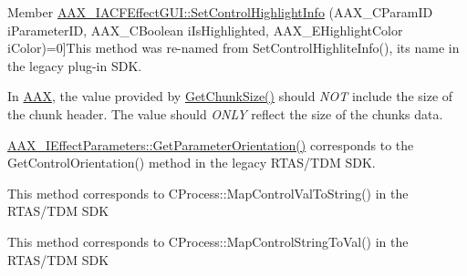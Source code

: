 \begin{DoxyRefList}
\hypertarget{a00385__porting_notes000031}{}%
Member \hyperlink{a00060_a3922a4b9fef09e88440d7655422c2b96}{A\+A\+X\+\_\+\+I\+A\+C\+F\+Effect\+G\+U\+I\+:\+:Set\+Control\+Highlight\+Info} (A\+A\+X\+\_\+\+C\+Param\+I\+D i\+Parameter\+I\+D, A\+A\+X\+\_\+\+C\+Boolean i\+Is\+Highlighted, A\+A\+X\+\_\+\+E\+Highlight\+Color i\+Color)=0]This method was re-\/named from {\ttfamily Set\+Control\+Highlite\+Info()}, its name in the legacy plug-\/in S\+D\+K. 
\item[\label{a00385__porting_notes000035}%
\hypertarget{a00385__porting_notes000035}{}%
Member \hyperlink{a00061_aa986711cd372febcaae803e86ae08f63}{A\+A\+X\+\_\+\+I\+A\+C\+F\+Effect\+Parameters\+:\+:Get\+Chunk\+Size} (A\+A\+X\+\_\+\+C\+Type\+I\+D i\+Chunk\+I\+D, uint32\+\_\+t $\ast$o\+Size) const =0]In \hyperlink{a00288}{A\+A\+X}, the value provided by \hyperlink{a00061_aa986711cd372febcaae803e86ae08f63}{Get\+Chunk\+Size()} should {\itshape N\+O\+T} include the size of the chunk header. The value should {\itshape O\+N\+L\+Y} reflect the size of the chunk\textquotesingle{}s data. 
\item[\label{a00385__porting_notes000032}%
\hypertarget{a00385__porting_notes000032}{}%
Member \hyperlink{a00061_ac122e1a693296b059dca4350a5ff1dfe}{A\+A\+X\+\_\+\+I\+A\+C\+F\+Effect\+Parameters\+:\+:Get\+Parameter\+Orientation} (A\+A\+X\+\_\+\+C\+Param\+I\+D i\+Parameter\+I\+D, A\+A\+X\+\_\+\+E\+Parameter\+Orientation $\ast$o\+Parameter\+Orientation) const =0]\hyperlink{a00061_ac122e1a693296b059dca4350a5ff1dfe}{A\+A\+X\+\_\+\+I\+Effect\+Parameters\+::\+Get\+Parameter\+Orientation()} corresponds to the Get\+Control\+Orientation() method in the legacy R\+T\+A\+S/\+T\+D\+M S\+D\+K. 
\item[\label{a00385__porting_notes000034}%
\hypertarget{a00385__porting_notes000034}{}%
Member \hyperlink{a00061_add995f2eb5a3967c48dd9f3e21f003aa}{A\+A\+X\+\_\+\+I\+A\+C\+F\+Effect\+Parameters\+:\+:Get\+Parameter\+String\+From\+Value} (A\+A\+X\+\_\+\+C\+Param\+I\+D i\+Parameter\+I\+D, double i\+Value, \hyperlink{a00113}{A\+A\+X\+\_\+\+I\+String} $\ast$o\+Value\+String, int32\+\_\+t i\+Max\+Length) const =0]This method corresponds to C\+Process\+::\+Map\+Control\+Val\+To\+String() in the R\+T\+A\+S/\+T\+D\+M S\+D\+K 
\item[\label{a00385__porting_notes000033}%
\hypertarget{a00385__porting_notes000033}{}%
Member \hyperlink{a00061_a54bb12c9798e4f9a3a5b5d6f30ace992}{A\+A\+X\+\_\+\+I\+A\+C\+F\+Effect\+Parameters\+:\+:Get\+Parameter\+Value\+From\+String} (A\+A\+X\+\_\+\+C\+Param\+I\+D i\+Parameter\+I\+D, double $\ast$o\+Value, const \hyperlink{a00113}{A\+A\+X\+\_\+\+I\+String} \&i\+Value\+String) const =0]This method corresponds to C\+Process\+::\+Map\+Control\+String\+To\+Val() in the R\+T\+A\+S/\+T\+D\+M S\+D\+K 

\end{DoxyRefList}

